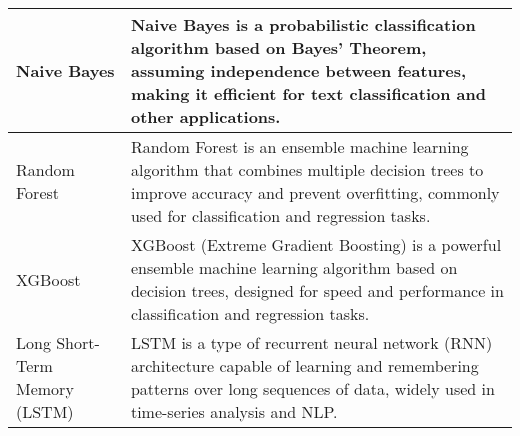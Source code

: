 \begin{center}
\begin{tabular}{|p{4cm}|p{10cm}|}
  \hline
  Naive Bayes & Naive Bayes is a probabilistic classification algorithm based on Bayes' Theorem, assuming independence between features, making it efficient for text classification and other applications. \\

  \hline
  Random Forest & Random Forest is an ensemble machine learning algorithm that combines multiple decision trees to improve accuracy and prevent overfitting, commonly used for classification and regression tasks. \\

  \hline
  XGBoost & XGBoost (Extreme Gradient Boosting) is a powerful ensemble machine learning algorithm based on decision trees, designed for speed and performance in classification and regression tasks. \\

  \hline
  Long Short-Term Memory (LSTM) & LSTM is a type of recurrent neural network (RNN) architecture capable of learning and remembering patterns over long sequences of data, widely used in time-series analysis and NLP. \\
  \hline

\end{tabular}

  
\end{center}



